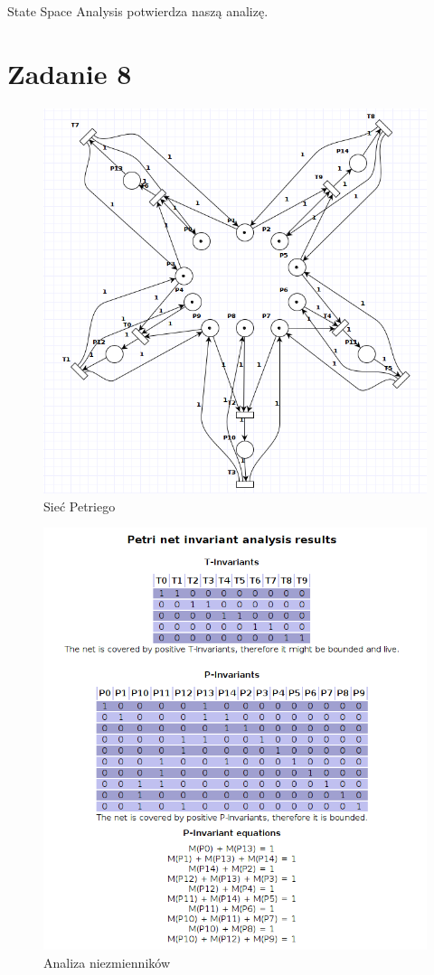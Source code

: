\documentclass[12pt,a4paper,table]{article}
\begin{document}
    State Space Analysis potwierdza naszą analizę.


    \section{Zadanie 8}

    \begin{figure}[H]
        \centering
        \includegraphics[width=1\linewidth]{img/zad8-1.png}
        \caption{Sieć Petriego}
        \label{fig:zad8-1}
    \end{figure}

    \begin{figure}[H]
        \centering
        \includegraphics[width=0.8\linewidth]{img/zad8-2.png}
        \caption{Analiza niezmienników}
        \label{fig:zad8-2}
    \end{figure}
\end{document}

